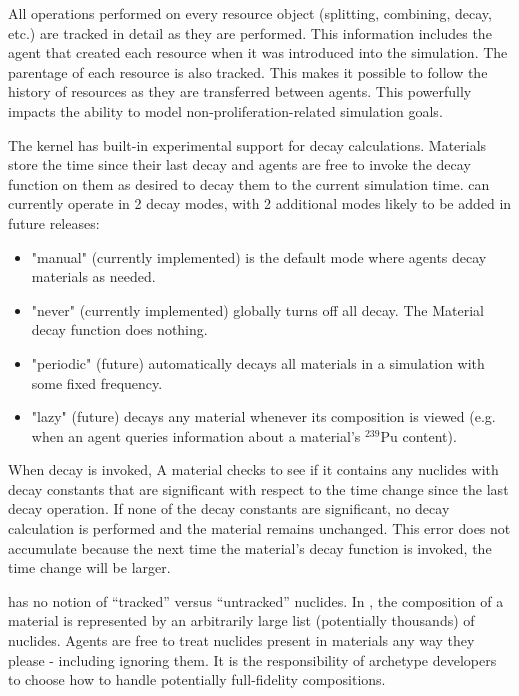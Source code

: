 All operations performed on every resource object (splitting, combining,
decay, etc.) are tracked in detail as they are performed.  This information
includes the agent that created each resource when it was introduced into the
simulation.  The parentage of each resource is also tracked. This makes it
possible to follow the history of resources as they are transferred between
agents.  This powerfully impacts the ability to model
non-proliferation-related simulation goals.

The \Cyclus kernel has built-in experimental support for decay calculations.
Materials store the time since their last decay and agents are free to
invoke the decay function on them as desired to decay them to the current
simulation time. \Cyclus can currently operate in 2 decay modes, with 2 additional
modes likely to be added in future releases:

\begin{itemize}

    \item "manual" (currently implemented) is the default mode
        where agents decay materials as needed.

    \item "never" (currently implemented) globally turns off all decay.
        The Material decay function does nothing.

    \item "periodic" (future) automatically decays all materials in a
        simulation with some fixed frequency.

    \item "lazy" (future) decays any material whenever its composition is
        viewed (e.g. when an agent queries information about a material's
        $^{239}$Pu content).

\end{itemize}


When decay is invoked, A material checks to see if it contains any nuclides with
decay constants that are significant with respect to the time change since the
last decay operation.  If none of the decay constants are significant, no decay
calculation is performed and the material remains unchanged.  This error does
not accumulate because the next time the material's decay function is invoked,
the time change will be larger.

\Cyclus has no notion of ``tracked'' versus ``untracked'' nuclides.  In \Cyclus, the composition of a material
is represented by an arbitrarily large list (potentially thousands) of
nuclides.  Agents are free to treat nuclides present in materials any way they
please - including ignoring them.  It is the responsibility of archetype
developers to choose how to handle potentially full-fidelity compositions.

